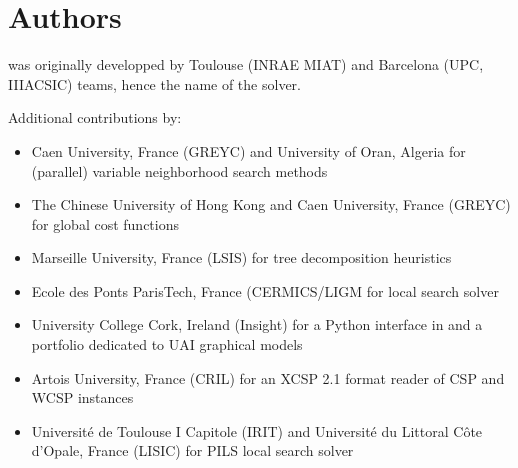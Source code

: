 \documentclass[letterpaper,10pt,openany,oneside,english]{sphinxmanual}
\begin{document}
\chapter{Authors}
\label{\detokenize{presentation:authors}}\label{\detokenize{presentation:id6}}
\sphinxAtStartPar
{} was originally developped by Toulouse (INRAE MIAT) and Barcelona (UPC, IIIA\sphinxhyphen{}CSIC) teams, hence the name of the solver.

\sphinxAtStartPar
Additional contributions by:
\begin{itemize}
\item {} 
\sphinxAtStartPar
Caen University, France (GREYC) and University of Oran, Algeria for (parallel) variable neighborhood search methods

\item {} 
\sphinxAtStartPar
The Chinese University of Hong Kong and Caen University, France (GREYC) for global cost functions

\item {} 
\sphinxAtStartPar
Marseille University, France (LSIS) for tree decomposition heuristics

\item {} 
\sphinxAtStartPar
Ecole des Ponts ParisTech, France (CERMICS/LIGM for  local search solver

\item {} 
\sphinxAtStartPar
University College Cork, Ireland (Insight) for a Python interface in   and a portfolio dedicated to UAI graphical models 

\item {} 
\sphinxAtStartPar
Artois University, France (CRIL) for an XCSP 2.1 format reader of CSP and WCSP instances

\item {} 
\sphinxAtStartPar
Université de Toulouse I Capitole (IRIT) and Université du Littoral Côte d’Opale, France (LISIC) for PILS local search solver

\end{itemize}
\end{document}
